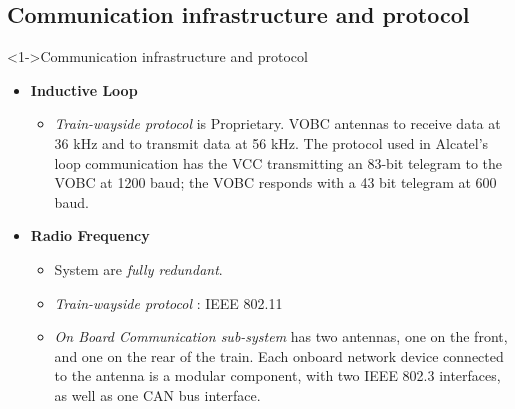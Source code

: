 \subsection{Communication infrastructure and protocol }
\frame
{
  
\begin{block}<1->{Communication infrastructure and protocol}
\begin{itemize}
\item \textbf{Inductive Loop} \begin{itemize}
\item \textit{Train-wayside protocol} is Proprietary.  VOBC antennas to receive data at 36 kHz and to transmit data at 56 kHz.  The protocol used in Alcatel's loop communication has the VCC transmitting an 83-bit telegram to the VOBC at 1200 baud; the VOBC responds with a 43 bit telegram at 600 baud.  

\end{itemize}

\item \textbf{Radio Frequency} \begin{itemize}
\item System are \textit{fully redundant}.
\item \textit{Train-wayside protocol} : IEEE 802.11
\item \textit{On Board Communication sub-system} has two antennas, one on the front, and one on the rear of the train. Each onboard network device connected to the antenna is a modular component, with two IEEE 802.3 interfaces, as well as one CAN bus interface.
\end{itemize}


\end{itemize}

     




\end{block}


}


